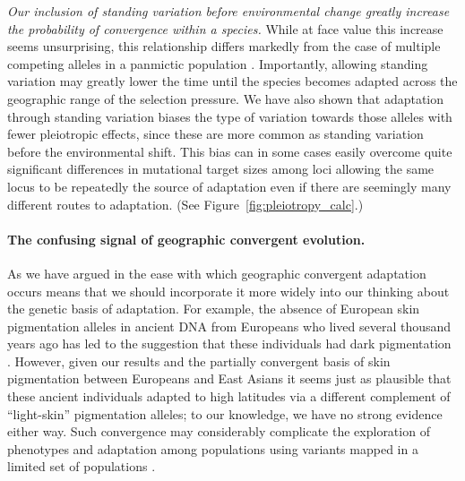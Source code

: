 \documentclass{article}
\newcommand{\gc}[1]{{\it\color{blue}#1}}
\begin{document}
\gc{Our inclusion of standing variation 
before environmental change greatly increase the probability of
convergence within a species.}
While at face value this increase seems unsurprising,
this relationship differs markedly from the case of multiple competing
alleles in a panmictic population \citep[see discussion above and in ][]{softsweepsI,softsweepsII}. 
Importantly, allowing standing variation may greatly lower the time until the species becomes adapted 
across the geographic range of the selection pressure. We have also
shown that adaptation through standing variation biases the type of variation towards those alleles 
with fewer pleiotropic effects, since these are more common as standing variation before the environmental shift. 
This bias can in some cases easily overcome quite significant differences in mutational target sizes
among loci allowing the same locus to be repeatedly the source of
adaptation even if there are seemingly many different routes to adaptation.
(See Figure~\ref{fig:pleiotropy_calc}.)

\paragraph{The confusing signal of geographic convergent evolution.}
As we have argued in \citet{ralphcoop2010} the ease with which
geographic convergent adaptation occurs means that we should
incorporate it more widely into our thinking about the genetic basis
of adaptation. For example, the absence of European skin pigmentation alleles in
ancient DNA from Europeans who lived several thousand years ago
has led to the suggestion that these individuals had dark
pigmentation \citep{olalde2014derived,lazaridis2013ancient, Wilde2014}. 
However, given our results and the partially convergent
basis of skin pigmentation between Europeans and East Asians
\citep{norton-human-pigmentation,edwards2010pigmentation} it seems just as plausible that these ancient individuals
adapted to high latitudes via a different complement of ``light-skin'' pigmentation alleles;
to our knowledge, we have no strong evidence either way.
Such convergence may considerably complicate the 
exploration of phenotypes and adaptation among populations using variants mapped in a
limited set of populations \citep{Berg:14}.
\end{document}
